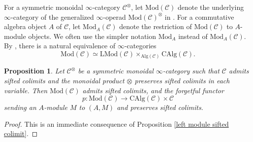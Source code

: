 \documentclass[10pt]{amsart}
\newtheorem{prop}[thm]{Proposition}
\theoremstyle{definition}
\numberwithin{equation}{section}
\newcommand{\cC}{\mathcal{C}}
\newcommand{\Alg}{\mathrm{Alg}}
\newcommand{\CAlg}{\mathrm{CAlg}}
\newcommand{\LMod}{\mathrm{LMod}}
\newcommand{\Mod}{\mathrm{Mod}}
\begin{document}
For a symmetric monoidal $\infty$-category $\cC^\otimes$,
let $\Mod(\cC)$ denote the underlying $\infty$-category of the generalized $\infty$-operad $\Mod(\cC)^{\otimes}$ in \cite[Definition 4.5.1.1]{HA}.
For a commutative algebra object $A$ of $\cC$,
let $\Mod_A(\cC)$ denote the restriction of $\Mod(\cC)$ to $A$-module objects.
We often use the simpler notation $\Mod_A$ instead of $\Mod_A(\cC)$.
By \cite[Corollary 4.5.1.6]{HA},
there is a natural equivalence of $\infty$-categories
\[
\Mod(\cC)\simeq \LMod(\cC)\times_{\Alg(\cC)}\CAlg(\cC).
\]

\begin{prop}
\label{module sifted colimit}
Let $\cC^{\otimes}$ be a symmetric monoidal $\infty$-category such that $\cC$ admits sifted colimits and the monoidal product $\otimes$ preserves sifted colimits in each variable.
Then $\Mod(\cC)$ admits sifted colimits,
and the forgetful functor
\[
p
\colon
\Mod(\cC)
\to
\CAlg(\cC) \times \cC
\]
sending an $A$-module $M$ to $(A,M)$ and preserves sifted colimits.
\end{prop}
\begin{proof}
This is an immediate consequence of Proposition \ref{left module sifted colimit}.
\end{proof}



\end{document}
